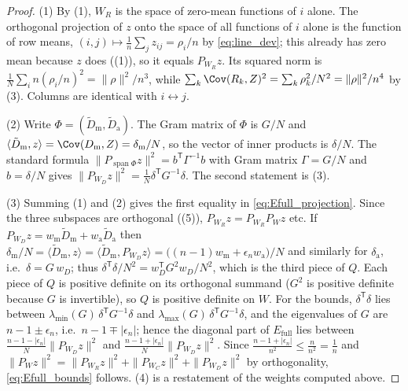 \begin{proof}
(1) By (1), $W_R$ is the space of zero-mean functions of $i$ alone.  The orthogonal
projection of $z$ onto the space of all functions of $i$ alone is the function of row means,
$(i,j)\mapsto\frac1n\sum_j z_{ij}=\rho_i/n$ by \eqref{eq:line_dev}; this already has zero mean because $z$ does
((1)), so it equals $P_{W_R}z$.  Its squared norm is
$\frac1N\sum_i n(\rho_i/n)^{2}=\|\rho\|^{2}/n^{3}$, while $\sum_k\Cov(R_k,Z)^{2}=\sum_k\rho_k^{2}/N^{2}=\|\rho\|^{2}/n^{4}$
by (3).  Columns are identical with $i\leftrightarrow j$.

(2) Write $\Phi=(\tilde D_{\mathrm m},\tilde D_{\mathrm a})$.  The Gram matrix of $\Phi$ is $G/N$ and
$\langle\tilde D_{\mathrm m},z\rangle=\Cov(D_{\mathrm m},Z)=\delta_{\mathrm m}/N$, so the vector of inner products is $\delta/N$.
The standard formula $\|P_{\operatorname{span}\Phi}z\|^{2}=b^{\mathsf T}\Gamma^{-1}b$ with Gram matrix $\Gamma=G/N$
and $b=\delta/N$ gives $\|P_{W_D}z\|^{2}=\frac1N\delta^{\mathsf T}G^{-1}\delta$.  The second statement is
(3).

(3) Summing (1) and (2) gives the first equality in \eqref{eq:Efull_projection}.  Since the three subspaces
are orthogonal ((5)), $P_{W_R}z=P_{W_R}P_Wz$ etc.  If $P_{W_D}z=w_{\mathrm m}\tilde D_{\mathrm m}+w_{\mathrm a}\tilde D_{\mathrm a}$
then $\delta_{\mathrm m}/N=\langle\tilde D_{\mathrm m},z\rangle=\langle\tilde D_{\mathrm m},P_{W_D}z\rangle=\bigl((n-1)w_{\mathrm m}+\epsilon_nw_{\mathrm a}\bigr)/N$
and similarly for $\delta_{\mathrm a}$, i.e.\ $\delta=G\,w_D$; thus $\delta^{\mathsf T}\delta/N^{2}=w_D^{\mathsf T}G^{2}w_D/N^{2}$,
which is the third piece of $Q$.  Each piece of $Q$ is positive definite on its orthogonal summand ($G^{2}$ is positive definite
because $G$ is invertible), so $Q$ is positive definite on $W$.
For the bounds, $\delta^{\mathsf T}\delta$ lies between $\lambda_{\min}(G)\,\delta^{\mathsf T}G^{-1}\delta$ and
$\lambda_{\max}(G)\,\delta^{\mathsf T}G^{-1}\delta$, and the eigenvalues of $G$ are $n-1\pm\epsilon_n$, i.e.\
$n-1\mp|\epsilon_n|$; hence the diagonal part of $E_{\mathrm{full}}$ lies between
$\frac{n-1-|\epsilon_n|}{N}\|P_{W_D}z\|^{2}$ and $\frac{n-1+|\epsilon_n|}{N}\|P_{W_D}z\|^{2}$.
Since $\frac{n-1+|\epsilon_n|}{n^{2}}\le\frac{n}{n^{2}}=\frac1n$ and
$\|P_Wz\|^{2}=\|P_{W_R}z\|^{2}+\|P_{W_C}z\|^{2}+\|P_{W_D}z\|^{2}$ by orthogonality, \eqref{eq:Efull_bounds} follows.
(4) is a restatement of the weights computed above.
\end{proof}

